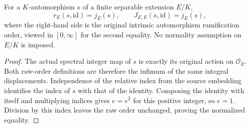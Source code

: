 \begin{lemma}
\label{fw:embedding-pair-automorphism}
\leanok
For a $K$-automorphism $s$ of a finite separable extension $E/K$,
\[
 r_E(s,\mathrm{id})=j_E(s),\qquad
 J_{E,E}(s,\mathrm{id})=j_E(s),
\]
where the right-hand side is the original intrinsic automorphism
ramification order, viewed in $[0,\infty]$ for the second equality.
No normality assumption on $E/K$ is imposed.
\end{lemma}
\begin{proof}
The actual spectral integer map of $s$ is exactly its original
action on $\mathcal O_E$. Both raw-order definitions are therefore
the infimum of the same integral displacements. Independence of the
relative index from the source embedding identifies the index of
$s$ with that of the identity. Composing the identity with itself
and multiplying indices gives $e=e^2$ for this positive integer,
so $e=1$. Division by this index leaves the raw order unchanged,
proving the normalized equality.
\end{proof}

